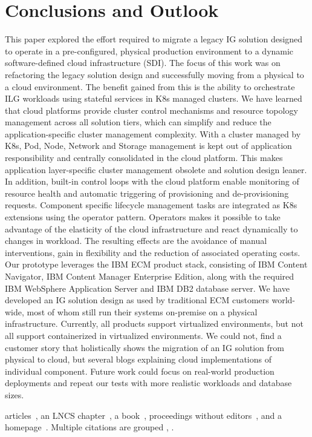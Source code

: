\documentclass[runningheads]{llncs}
\begin{document}
\section{Conclusions and Outlook}
This paper explored the effort required to migrate a legacy IG solution designed to operate in a pre-configured, physical production environment to a dynamic software-defined cloud infrastructure (SDI). The focus of this work was on refactoring the legacy solution design and successfully moving from a physical to a cloud environment. The benefit gained from this is the ability to orchestrate ILG workloads using stateful services in K8s managed clusters. We have learned that cloud platforms provide cluster control mechanisms and resource topology management across all solution tiers, which can simplify and reduce the application-specific cluster management complexity. With a cluster managed by K8s, Pod, Node, Network and Storage management is kept out of application responsibility and centrally consolidated in the cloud platform. This makes application layer-specific cluster management obsolete and solution design leaner. In addition, built-in control loops with the cloud platform enable monitoring of resource health and automatic triggering of provisioning and de-provisioning requests. Component specific lifecycle management tasks are integrated as K8s extensions using the operator pattern. Operators makes it possible to take advantage of the elasticity of the cloud infrastructure and react dynamically to changes in workload. The resulting effects are the avoidance of manual interventions, gain in flexibility and the reduction of associated operating costs. 
Our prototype leverages the IBM ECM product stack, consisting of IBM Content Navigator, IBM Content Manager Enterprise Edition, along with the required IBM WebSphere Application Server and IBM DB2 database server. We have developed an IG solution design as used by traditional ECM customers world-wide, most of whom still run their systems on-premise on a physical infrastructure. Currently, all products support virtualized environments, but not all support containerized in virtualized environments. We could not, find a customer story that holistically shows the migration of an IG solution from physical to cloud, but several blogs explaining cloud implementations of individual component. 
Future work could focus on real-world production deployments and repeat our tests with more realistic workloads and database sizes.


%
%
articles~\cite{ref_article1}, an LNCS chapter~\cite{ref_lncs1}, a
book~\cite{ref_book1}, proceedings without editors~\cite{ref_proc1},
and a homepage~\cite{ref_url1}. Multiple citations are grouped
\cite{ref_article1,ref_lncs1,ref_book1},
\cite{ref_article1,ref_book1,ref_proc1,ref_url1}.
\end{document}
